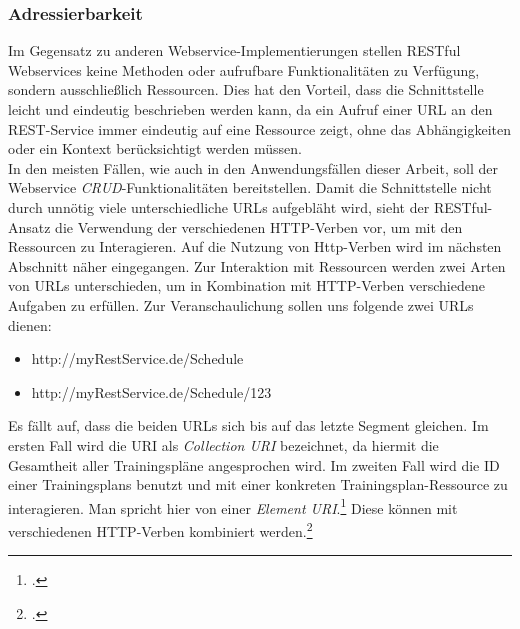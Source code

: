 \subsubsection*{Adressierbarkeit}
Im Gegensatz zu anderen Webservice-Implementierungen stellen \ac{REST}ful Webservices keine Methoden oder aufrufbare Funktionalitäten zu Verfügung, sondern ausschließlich Ressourcen. Dies hat den Vorteil, dass die Schnittstelle leicht und eindeutig beschrieben werden kann, da ein Aufruf einer \ac{URL} an den \ac{REST}-Service immer eindeutig auf eine Ressource zeigt, ohne das Abhängigkeiten oder ein Kontext berücksichtigt werden müssen. \\
In den meisten Fällen, wie auch in den Anwendungsfällen dieser Arbeit, soll der Webservice \textit{\ac{CRUD}}-Funktionalitäten bereitstellen. Damit die Schnittstelle nicht durch unnötig viele unterschiedliche \ac{URL}s aufgebläht wird, sieht der \ac{REST}ful-Ansatz die Verwendung der verschiedenen \ac{HTTP}-Verben vor, um mit den Ressourcen zu Interagieren. Auf die Nutzung von Http-Verben wird im nächsten Abschnitt näher eingegangen. Zur Interaktion mit Ressourcen werden zwei Arten von \ac{URL}s unterschieden, um in Kombination mit \ac{HTTP}-Verben verschiedene Aufgaben zu erfüllen. Zur Veranschaulichung sollen uns folgende zwei \ac{URL}s dienen:
\begin{itemize}
\item http://myRestService.de/Schedule
\item http://myRestService.de/Schedule/123
\end{itemize}
Es fällt auf, dass die beiden \ac{URL}s sich bis auf das letzte Segment gleichen. Im ersten Fall wird die \ac{URI} als \textit{Collection \ac{URI}} bezeichnet, da hiermit die Gesamtheit aller Trainingspläne angesprochen wird. Im zweiten Fall wird die ID einer Trainingsplans benutzt und mit einer konkreten Trainingsplan-Ressource zu interagieren. Man spricht hier von einer \textit{Element \ac{URI}}.\footcite[S. 12ff.]{Building-a-REST-Service} Diese können mit verschiedenen \ac{HTTP}-Verben kombiniert werden.\footcite[S. 26ff.]{REST-und-HTTP}
